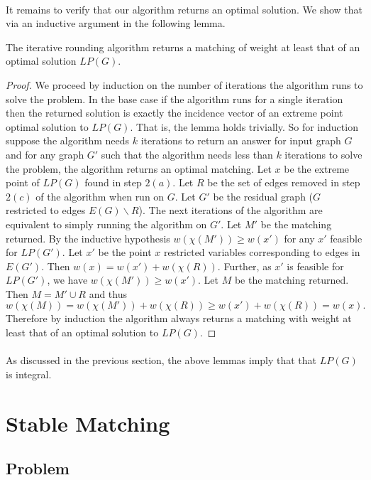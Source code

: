 \paragraph{}
It remains to verify that our algorithm returns an optimal solution. We show that via an inductive argument in the following lemma.
\begin{lemma}
The iterative rounding algorithm returns a matching of weight at least that of an optimal solution $LP(G)$.
\end{lemma}
\begin{proof}
We proceed by induction on the number of iterations the algorithm runs to solve the problem. In the base case if the algorithm runs for a single iteration then the returned solution is exactly the incidence vector of an extreme point optimal solution to $LP(G)$. That is, the lemma holds trivially. So for induction suppose the algorithm needs $k$ iterations to return an answer for input graph $G$ and for any graph $G'$ such that the algorithm needs less than $k$ iterations to solve the problem, the algorithm returns an optimal matching. Let $x$ be the extreme point of $LP(G)$ found in step $2(a)$. Let $R$ be the set of edges removed in step $2(c)$ of the algorithm when run on $G$. Let $G'$ be the residual graph ($G$ restricted to edges $E(G) \backslash R$). The next iterations of the algorithm are equivalent to simply running the algorithm on $G'$. Let $M'$ be the matching returned. By the inductive hypothesis $w(\chi(M')) \geq w(x')$ for any $x'$ feasible for $LP(G')$. Let $x'$ be the point $x$ restricted variables corresponding to edges in $E(G')$. Then $w(x) = w(x') + w(\chi(R))$. Further, as $x'$ is feasible for $LP(G')$, we have
$w(\chi(M')) \geq w(x')$. Let $M$ be the matching returned. Then $M = M' \cup R$ and thus
$$w(\chi(M)) = w(\chi(M')) + w(\chi(R)) \geq w(x') + w(\chi(R)) = w(x).$$
Therefore by induction the algorithm always returns a matching with weight at least that of an optimal solution to $LP(G)$. 
\end{proof}
\paragraph{}
As discussed in the previous section, the above lemmas imply that that $LP(G)$ is integral.
\section{Stable Matching}\label{sec:SM}
\subsection{Problem}
